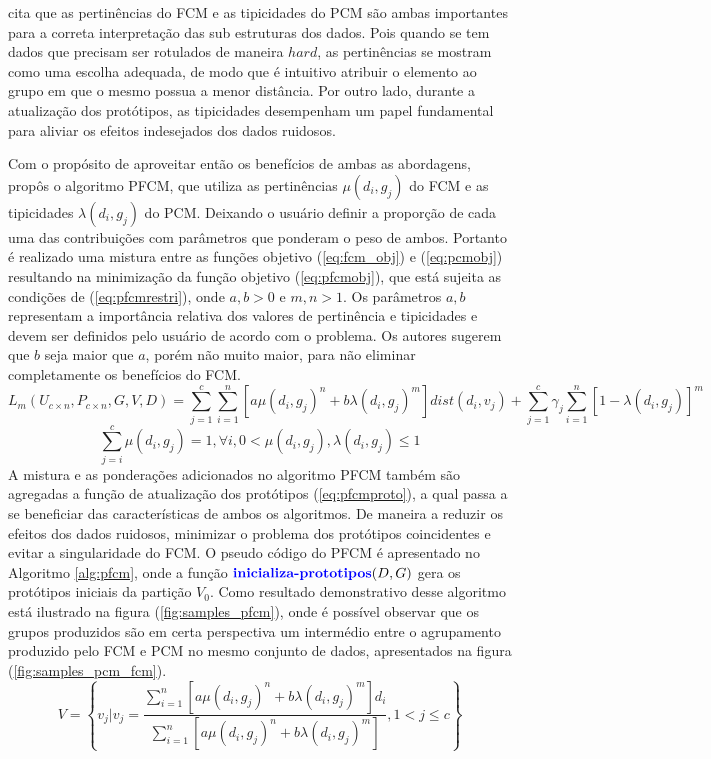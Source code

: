 \cite{Carvalho2016} cita que as pertinências do FCM e as tipicidades do PCM são ambas importantes
para a correta interpretação das sub estruturas dos dados. Pois quando se tem dados que precisam
ser rotulados de maneira $hard$, as pertinências se mostram como uma escolha adequada, de modo que é
intuitivo atribuir o elemento ao grupo em que o mesmo possua a menor distância. Por outro lado,
durante a atualização dos protótipos, as tipicidades desempenham um papel fundamental para 
aliviar os efeitos indesejados dos dados ruidosos.

Com o propósito de aproveitar então os benefícios de ambas as abordagens, \cite{Pal2005} propôs o
algoritmo PFCM, que utiliza as pertinências $\mu(d_i,g_j)$ do FCM e as tipicidades
$\lambda(d_i,g_j)$ do PCM. Deixando o usuário definir a proporção de cada uma das contribuições com
parâmetros que ponderam o peso de ambos. Portanto é realizado uma mistura entre as funções objetivo
(\ref{eq:fcm_obj}) e (\ref{eq:pcmobj}) resultando na minimização da função objetivo
(\ref{eq:pfcmobj}), que está sujeita as condições de (\ref{eq:pfcmrestri}), onde 
$a,b > 0$ e $m,n > 1$. Os parâmetros $a,b$ representam a importância
relativa dos valores de pertinência e tipicidades e devem ser definidos pelo usuário de acordo com o
problema. Os autores sugerem que $b$ seja maior que $a$, porém não muito maior, para não eliminar
completamente os benefícios do FCM. 
\begin{equation}
  L_m(U_{c \times n},P_{c \times n},G,V,D) = \sum_{j=1}^c 
  \sum_{i=1}^n [a\mu(d_i,g_j)^n + b\lambda(d_i, g_j)^m] dist(d_i, v_j) +
  \sum_{j=1}^c \gamma_j \sum_{i=1}^n [1 - \lambda(d_i, g_j)]^m
  \label{eq:pfcmobj}
\end{equation}
\begin{equation}
  \sum_{j=i}^c \mu(d_i,g_j) = 1, \forall i, 0 < \mu(d_i,g_j),\lambda(d_i,g_j) \leq 1
  \label{eq:pfcmrestri}
\end{equation}
A mistura e as ponderações adicionados no algoritmo PFCM também são agregadas a função de
atualização dos protótipos (\ref{eq:pfcmproto}), a qual passa a se beneficiar das características de
ambos os algoritmos.
De maneira a reduzir os efeitos dos dados ruidosos, minimizar o problema dos protótipos coincidentes
e evitar a singularidade do FCM. O pseudo código do PFCM é apresentado no Algoritmo \ref{alg:pfcm}, 
onde a
função $\textbf{\color{blue}inicializa-prototipos}(D,G)$ gera os protótipos iniciais da partição
$V_0$. Como resultado demonstrativo desse algoritmo está ilustrado na figura
(\ref{fig:samples_pfcm}), onde é possível observar que os grupos produzidos são em certa perspectiva
um intermédio entre o agrupamento produzido pelo FCM e PCM no mesmo conjunto de dados, apresentados
na figura (\ref{fig:samples_pcm_fcm}).
\begin{equation}
  V = \left\{ v_j | v_j = \frac{\sum_{i=1}^n[a\mu(d_i,g_j)^n + b\lambda(d_i, g_j)^m] d_i}
    {\sum_{i=1}^n[a\mu(d_i,g_j)^n + b\lambda(d_i, g_j)^m]}, 
  1 < j \leq c \right\} 
  \label{eq:pfcmproto}
\end{equation}

